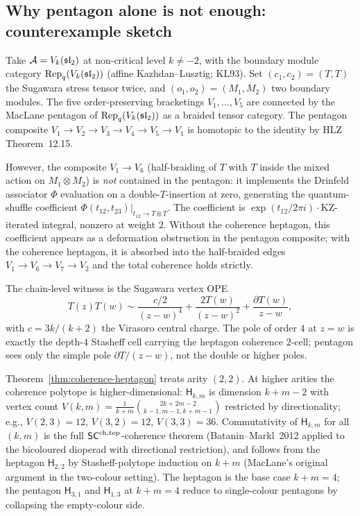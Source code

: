 \subsection{Why pentagon alone is not enough: counterexample sketch}

\begin{example}\label{ex:pentagon-fails-vk}%
%
Take $\mathcal{A} = V_k(\mathfrak{sl}_2)$ at non-critical level $k\neq -2$, with the
boundary module category $\mathrm{Rep}_q(V_k(\mathfrak{sl}_2))$ (affine
Kazhdan--Lusztig; KL93). Set
$(c_1, c_2) = (T, T)$ the Sugawara stress tensor twice, and
$(o_1, o_2) = (M_1, M_2)$ two boundary modules. The five
order-preserving bracketings $V_1,\ldots,V_5$ are connected by the
MacLane pentagon of $\mathrm{Rep}_q(V_k(\mathfrak{sl}_2))$ as a braided tensor
category. The pentagon composite $V_1 \to V_2\to V_3\to V_4\to V_5\to V_1$
is homotopic to the identity by HLZ~\cite{HLZ}\,Theorem~12.15.

However, the composite $V_1 \to V_6$
(half-braiding of $T$ with $T$ inside the mixed action on
$M_1 \otimes M_2$) is \emph{not} contained in the pentagon: it
implements the Drinfeld associator $\Phi$ evaluation on a
double-$T$-insertion at zero, generating the quantum-shuffle
coefficient
$\Phi(t_{12}, t_{23})\bigl|_{t_{12}\to T\otimes T}$. The coefficient
is $\exp(t_{12}/2\pi i)\cdot \mathrm{KZ}$-iterated integral, nonzero
at weight $2$. Without the coherence heptagon, this coefficient
appears as a deformation obstruction in the pentagon composite;
with the coherence heptagon, it is absorbed into the half-braided
edges $V_1\to V_6\to V_7\to V_2$ and the total coherence holds
strictly.

The chain-level witness is the Sugawara vertex OPE
\[
T(z)T(w) \sim \frac{c/2}{(z-w)^4} + \frac{2T(w)}{(z-w)^2}
 + \frac{\partial T(w)}{z-w},
\]
with $c = 3k/(k+2)$ the Virasoro central charge. The pole of order
$4$ at $z = w$ is exactly the depth-$4$ Stasheff cell carrying the
heptagon coherence $2$-cell; pentagon sees only the simple pole
$\partial T/(z-w)$, not the double or higher poles.
\end{example}

\begin{remark}
\label{rem:heptagon-scope}%
Theorem~\ref{thm:coherence-heptagon} treats arity $(2, 2)$. At
higher arities the coherence polytope is higher-dimensional:
$\mathsf{H}_{k,m}$ is dimension $k + m - 2$ with vertex count
$V(k, m) = \tfrac{1}{k+m}\binom{2k+2m-2}{k-1,m-1,k+m-1}$
restricted by directionality; e.g.,
$V(2, 3) = 12$, $V(3, 2) = 12$, $V(3, 3) = 36$. Commutativity of
$\mathsf{H}_{k,m}$ for all $(k, m)$ is the full $\mathsf{SC}^{\mathrm{ch},\mathrm{top}}$-coherence
theorem (Batanin--Markl~2012 applied to the bicoloured dioperad
with directional restriction), and follows from the heptagon
$\mathsf{H}_{2,2}$ by Stasheff-polytope induction on
$k + m$ (MacLane's original argument in the two-colour setting).
The heptagon is the base case $k + m = 4$; the pentagon
$\mathsf{H}_{3,1}$ and $\mathsf{H}_{1,3}$ at $k + m = 4$ reduce
to single-colour pentagons by collapsing the empty-colour side.
\end{remark}

